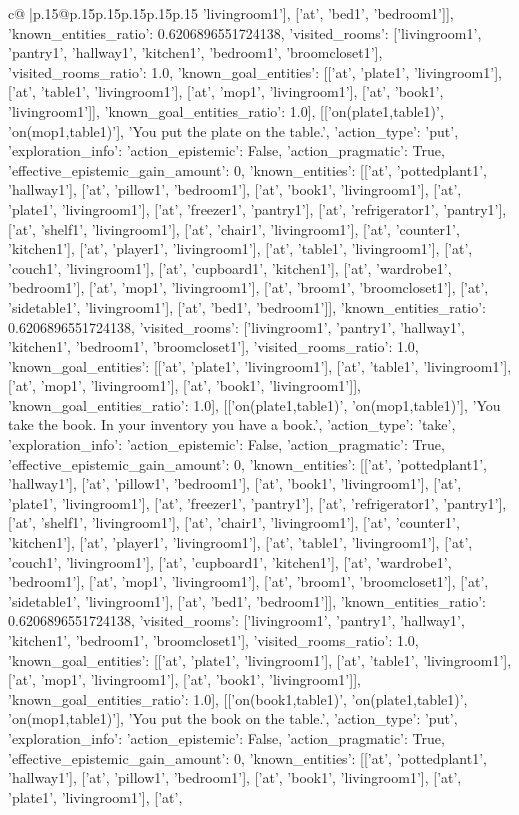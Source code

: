 \documentclass{article}
\begin{document}
{\begin{supertabular}{c@{$\;$}|p{.15\linewidth}@{}p{.15\linewidth}p{.15\linewidth}p{.15\linewidth}p{.15\linewidth}p{.15\linewidth}}
{{{'livingroom1'], ['at', 'bed1', 'bedroom1']], 'known_entities_ratio': 0.6206896551724138, 'visited_rooms': ['livingroom1', 'pantry1', 'hallway1', 'kitchen1', 'bedroom1', 'broomcloset1'], 'visited_rooms_ratio': 1.0, 'known_goal_entities': [['at', 'plate1', 'livingroom1'], ['at', 'table1', 'livingroom1'], ['at', 'mop1', 'livingroom1'], ['at', 'book1', 'livingroom1']], 'known_goal_entities_ratio': 1.0}}], [['on(plate1,table1)', 'on(mop1,table1)'], 'You put the plate on the table.', {'action_type': 'put', 'exploration_info': {'action_epistemic': False, 'action_pragmatic': True, 'effective_epistemic_gain_amount': 0, 'known_entities': [['at', 'pottedplant1', 'hallway1'], ['at', 'pillow1', 'bedroom1'], ['at', 'book1', 'livingroom1'], ['at', 'plate1', 'livingroom1'], ['at', 'freezer1', 'pantry1'], ['at', 'refrigerator1', 'pantry1'], ['at', 'shelf1', 'livingroom1'], ['at', 'chair1', 'livingroom1'], ['at', 'counter1', 'kitchen1'], ['at', 'player1', 'livingroom1'], ['at', 'table1', 'livingroom1'], ['at', 'couch1', 'livingroom1'], ['at', 'cupboard1', 'kitchen1'], ['at', 'wardrobe1', 'bedroom1'], ['at', 'mop1', 'livingroom1'], ['at', 'broom1', 'broomcloset1'], ['at', 'sidetable1', 'livingroom1'], ['at', 'bed1', 'bedroom1']], 'known_entities_ratio': 0.6206896551724138, 'visited_rooms': ['livingroom1', 'pantry1', 'hallway1', 'kitchen1', 'bedroom1', 'broomcloset1'], 'visited_rooms_ratio': 1.0, 'known_goal_entities': [['at', 'plate1', 'livingroom1'], ['at', 'table1', 'livingroom1'], ['at', 'mop1', 'livingroom1'], ['at', 'book1', 'livingroom1']], 'known_goal_entities_ratio': 1.0}}], [['on(plate1,table1)', 'on(mop1,table1)'], 'You take the book. In your inventory you have a book.', {'action_type': 'take', 'exploration_info': {'action_epistemic': False, 'action_pragmatic': True, 'effective_epistemic_gain_amount': 0, 'known_entities': [['at', 'pottedplant1', 'hallway1'], ['at', 'pillow1', 'bedroom1'], ['at', 'book1', 'livingroom1'], ['at', 'plate1', 'livingroom1'], ['at', 'freezer1', 'pantry1'], ['at', 'refrigerator1', 'pantry1'], ['at', 'shelf1', 'livingroom1'], ['at', 'chair1', 'livingroom1'], ['at', 'counter1', 'kitchen1'], ['at', 'player1', 'livingroom1'], ['at', 'table1', 'livingroom1'], ['at', 'couch1', 'livingroom1'], ['at', 'cupboard1', 'kitchen1'], ['at', 'wardrobe1', 'bedroom1'], ['at', 'mop1', 'livingroom1'], ['at', 'broom1', 'broomcloset1'], ['at', 'sidetable1', 'livingroom1'], ['at', 'bed1', 'bedroom1']], 'known_entities_ratio': 0.6206896551724138, 'visited_rooms': ['livingroom1', 'pantry1', 'hallway1', 'kitchen1', 'bedroom1', 'broomcloset1'], 'visited_rooms_ratio': 1.0, 'known_goal_entities': [['at', 'plate1', 'livingroom1'], ['at', 'table1', 'livingroom1'], ['at', 'mop1', 'livingroom1'], ['at', 'book1', 'livingroom1']], 'known_goal_entities_ratio': 1.0}}], [['on(book1,table1)', 'on(plate1,table1)', 'on(mop1,table1)'], 'You put the book on the table.', {'action_type': 'put', 'exploration_info': {'action_epistemic': False, 'action_pragmatic': True, 'effective_epistemic_gain_amount': 0, 'known_entities': [['at', 'pottedplant1', 'hallway1'], ['at', 'pillow1', 'bedroom1'], ['at', 'book1', 'livingroom1'], ['at', 'plate1', 'livingroom1'], ['at', }}}
\end{supertabular}}
\end{document}
